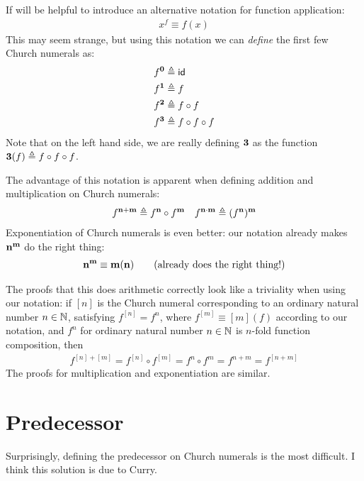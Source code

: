 If will be helpful to introduce an alternative notation for function application:
\begin{align*}
  x^f \equiv f(x)
\end{align*}
This may seem strange, but using this notation we can \emph{define} the first few Church numerals as:
\begin{align*}
  f^{\mathbf{0}} &\triangleq{} \mathsf{id}\\
  f^{\mathbf{1}} &\triangleq{} f \\
  f^{\mathbf{2}} &\triangleq{} f \circ f\\
  f^{\mathbf{3}} &\triangleq{} f \circ f \circ f
\end{align*}
Note that on the left hand side, we are really defining $\mathbf{3}$ as the function $\mathbf{3}(f) \triangleq{} f \circ f \circ f$.

The advantage of this notation is apparent when defining addition and multiplication on Church numerals:
\begin{align*}
  f^{\mathbf{n}+\mathbf{m}} \triangleq{} f^{\mathbf{n}} \circ f^{\mathbf{m}} &&
  f^{\mathbf{n}\cdot\mathbf{m}} \triangleq{} (f^{\mathbf{n}})^{\mathbf{m}}
\end{align*}
Exponentiation of Church numerals is even better: our notation already makes $\mathbf{n}^{\mathbf{m}}$ do the right thing:
\begin{align*}
  \mathbf{n}^{\mathbf{m}} \equiv \mathbf{m}(\mathbf{n}) \tag{already does the right thing!}
\end{align*}

The proofs that this does arithmetic correctly look like a triviality when using our notation:
if $[n]$ is the Church numeral corresponding to an ordinary natural number $n \in \mathbb{N}$,
\ie satisfying $f^{[n]} = f^n$, where $f^{[m]} \equiv [m](f)$ according to our notation,
and $f^n$ for ordinary natural number $n \in \mathbb{N}$ is $n$-fold function composition, then
\begin{align*}
  f^{[n]+[m]} = f^{[n]} \circ f^{[m]} = f^n \circ f^m = f^{n+m} = f^{[n+m]}
\end{align*}
The proofs for multiplication and exponentiation are similar.

\section{Predecessor}
Surprisingly, defining the predecessor on Church numerals is the most difficult. I think this solution is due to Curry.

